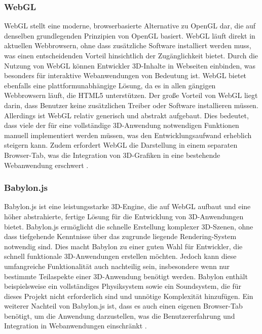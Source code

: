 \subsubsection{WebGL}
WebGL stellt eine moderne, browserbasierte Alternative zu OpenGL dar, die auf denselben grundlegenden Prinzipien von OpenGL basiert.
WebGL läuft direkt in aktuellen Webbrowsern, ohne dass zusätzliche Software installiert werden muss, was einen entscheidenden Vorteil hinsichtlich der Zugänglichkeit bietet.
Durch die Nutzung von WebGL können Entwickler 3D-Inhalte in Webseiten einbinden, was besonders für interaktive Webanwendungen von Bedeutung ist.
WebGL bietet ebenfalls eine plattformunabhängige Lösung, da es in allen gängigen Webbrowsern läuft, die HTML5 unterstützen. Der große Vorteil von WebGL liegt darin,
dass Benutzer keine zusätzlichen Treiber oder Software installieren müssen. Allerdings ist WebGL relativ generisch und abstrakt aufgebaut.
Dies bedeutet, dass viele der für eine vollständige 3D-Anwendung notwendigen Funktionen manuell implementiert werden müssen, was den Entwicklungsaufwand
erheblich steigern kann. Zudem erfordert WebGL die Darstellung in einem separaten Browser-Tab,
was die Integration von 3D-Grafiken in eine bestehende Webanwendung erschwert .

\subsubsection{Babylon.js}
Babylon.js ist eine leistungsstarke 3D-Engine, die auf WebGL aufbaut und eine höher abstrahierte, fertige Lösung für die Entwicklung von 3D-Anwendungen bietet.
Babylon.js ermöglicht die schnelle Erstellung komplexer 3D-Szenen, ohne dass tiefgehende Kenntnisse über das zugrunde liegende Rendering-System notwendig sind.
Dies macht Babylon zu einer guten Wahl für Entwickler, die schnell funktionale 3D-Anwendungen erstellen möchten.
Jedoch kann diese umfangreiche Funktionalität auch nachteilig sein, insbesondere wenn nur bestimmte Teilaspekte einer 3D-Anwendung benötigt werden.
Babylon enthält beispielsweise ein vollständiges Physiksystem sowie ein Soundsystem, die für dieses Projekt nicht erforderlich sind und unnötige Komplexität hinzufügen.
Ein weiterer Nachteil von Babylon.js ist, dass es auch einen eigenen Browser-Tab benötigt,
um die Anwendung darzustellen,
was die Benutzererfahrung und Integration in Webanwendungen einschränkt .

